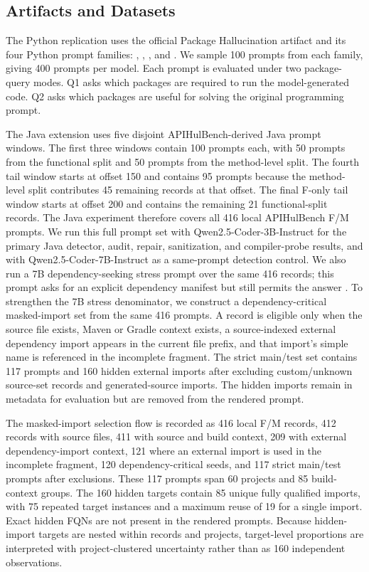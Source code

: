 \documentclass[pdflatex,sn-basic]{sn-jnl}
\newcommand{\codeid}[1]{\texttt{\detokenize{#1}}}
\begin{document}
\subsection{Artifacts and Datasets}

The Python replication uses the official Package Hallucination artifact and its four Python prompt families: \codeid{LLM_LY}, \codeid{LLM_AT}, \codeid{SO_LY}, and \codeid{SO_AT}. We sample 100 prompts from each family, giving 400 prompts per model. Each prompt is evaluated under two package-query modes. Q1 asks which packages are required to run the model-generated code. Q2 asks which packages are useful for solving the original programming prompt.

The Java extension uses five disjoint APIHulBench-derived Java prompt windows. The first three windows contain 100 prompts each, with 50 prompts from the functional split and 50 prompts from the method-level split. The fourth tail window starts at offset 150 and contains 95 prompts because the method-level split contributes 45 remaining records at that offset. The final F-only tail window starts at offset 200 and contains the remaining 21 functional-split records. The Java experiment therefore covers all 416 local APIHulBench F/M prompts. We run this full prompt set with Qwen2.5-Coder-3B-Instruct for the primary Java detector, audit, repair, sanitization, and compiler-probe results, and with Qwen2.5-Coder-7B-Instruct as a same-prompt detection control. We also run a 7B dependency-seeking stress prompt over the same 416 records; this prompt asks for an explicit dependency manifest but still permits the answer \codeid{No external dependency}. To strengthen the 7B stress denominator, we construct a dependency-critical masked-import set from the same 416 prompts. A record is eligible only when the source file exists, Maven or Gradle context exists, a source-indexed external dependency import appears in the current file prefix, and that import's simple name is referenced in the incomplete fragment. The strict main/test set contains 117 prompts and 160 hidden external imports after excluding custom/unknown source-set records and generated-source imports. The hidden imports remain in metadata for evaluation but are removed from the rendered prompt.

The masked-import selection flow is recorded as 416 local F/M records, 412 records with source files, 411 with source and build context, 209 with external dependency-import context, 121 where an external import is used in the incomplete fragment, 120 dependency-critical seeds, and 117 strict main/test prompts after exclusions. These 117 prompts span 60 projects and 85 build-context groups. The 160 hidden targets contain 85 unique fully qualified imports, with 75 repeated target instances and a maximum reuse of 19 for a single import. Exact hidden FQNs are not present in the rendered prompts. Because hidden-import targets are nested within records and projects, target-level proportions are interpreted with project-clustered uncertainty rather than as 160 independent observations.
\end{document}
